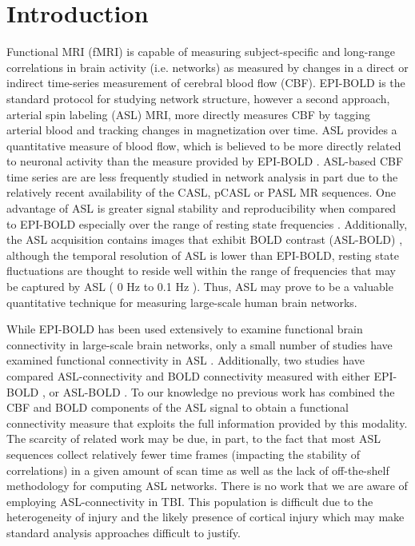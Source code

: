\documentclass{llncs}
\begin{document}
\section{Introduction}
Functional MRI (fMRI) is capable of measuring subject-specific and long-range correlations in brain activity (i.e. networks) as measured by changes in a direct or indirect time-series measurement of cerebral blood flow (CBF).  EPI-BOLD is the standard protocol for studying network structure, however a second approach, arterial spin labeling (ASL) MRI, more directly measures CBF by tagging arterial blood and tracking changes in magnetization over time. ASL provides a quantitative measure of blood flow, which is believed to be more directly related to neuronal activity than the measure provided by EPI-BOLD \cite{Wong1997}.  ASL-based CBF time series are are less frequently studied in network analysis in part due to the relatively recent availability of the CASL, pCASL or PASL MR sequences.  One advantage of ASL is greater signal stability and reproducibility when compared to EPI-BOLD especially over the range of resting state frequencies \cite{Aguirre2002}.  Additionally, the ASL acquisition contains images that exhibit BOLD contrast (ASL-BOLD) \cite{Wong1997}, although the temporal resolution of ASL is lower than EPI-BOLD, resting state fluctuations are thought to reside well within the range of frequencies that may be captured by ASL ( 0 Hz to 0.1 Hz ).  Thus, ASL may prove to be a valuable quantitative technique for measuring large-scale human brain networks.


While EPI-BOLD has been used extensively to examine functional brain connectivity in large-scale brain networks, only a small number of studies have examined functional connectivity in ASL \cite{Chuang2008,Zou2009}. Additionally, two studies have compared ASL-connectivity and BOLD connectivity measured with either EPI-BOLD \cite{Li2012}, or ASL-BOLD \cite{Viviani2011}.  To our knowledge no previous work has combined the CBF and BOLD components of the ASL signal to obtain a functional connectivity measure that exploits the full information provided by this modality. The scarcity of related work may be due, in part, to the fact that most ASL sequences collect relatively fewer time frames (impacting the stability of correlations) in a given amount of scan time as well as the lack of off-the-shelf methodology for computing ASL networks.  There is no work that we are aware of employing ASL-connectivity in TBI.   This population is difficult due to the heterogeneity of injury and the likely presence of cortical injury which may make standard analysis approaches difficult to justify. 
\end{document}
